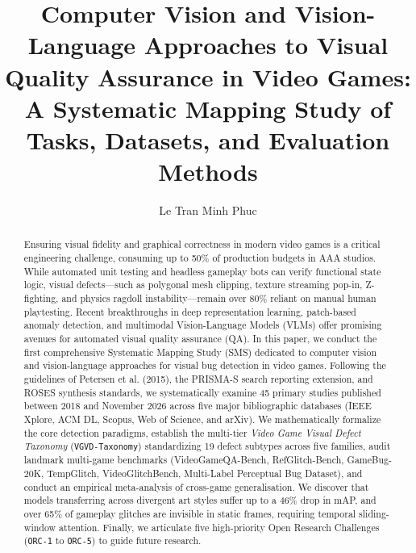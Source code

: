 \documentclass[preprint,12pt,3p]{elsarticle}
\begin{document}
\begin{frontmatter}

\title{Computer Vision and Vision-Language Approaches to Visual Quality Assurance in Video Games: A Systematic Mapping Study of Tasks, Datasets, and Evaluation Methods}

\author{Le Tran Minh Phuc}


\begin{abstract}
Ensuring visual fidelity and graphical correctness in modern video games is a critical engineering challenge, consuming up to 50\% of production budgets in AAA studios. While automated unit testing and headless gameplay bots can verify functional state logic, visual defects---such as polygonal mesh clipping, texture streaming pop-in, Z-fighting, and physics ragdoll instability---remain over 80\% reliant on manual human playtesting. Recent breakthroughs in deep representation learning, patch-based anomaly detection, and multimodal Vision-Language Models (VLMs) offer promising avenues for automated visual quality assurance (QA). 
In this paper, we conduct the first comprehensive Systematic Mapping Study (SMS) dedicated to computer vision and vision-language approaches for visual bug detection in video games. Following the guidelines of Petersen et al. (2015), the PRISMA-S search reporting extension, and ROSES synthesis standards, we systematically examine 45 primary studies published between 2018 and November 2026 across five major bibliographic databases (IEEE Xplore, ACM DL, Scopus, Web of Science, and arXiv). 
We mathematically formalize the core detection paradigms, establish the multi-tier \textit{Video Game Visual Defect Taxonomy} (\texttt{VGVD-Taxonomy}) standardizing 19 defect subtypes across five families, audit landmark multi-game benchmarks (VideoGameQA-Bench, RefGlitch-Bench, GameBug-20K, TempGlitch, VideoGlitchBench, Multi-Label Perceptual Bug Dataset), and conduct an empirical meta-analysis of cross-game generalisation. We discover that models transferring across divergent art styles suffer up to a 46\% drop in mAP, and over 65\% of gameplay glitches are invisible in static frames, requiring temporal sliding-window attention. Finally, we articulate five high-priority Open Research Challenges (\texttt{ORC-1} to \texttt{ORC-5}) to guide future research.
\end{abstract}


\end{frontmatter}
\end{document}
